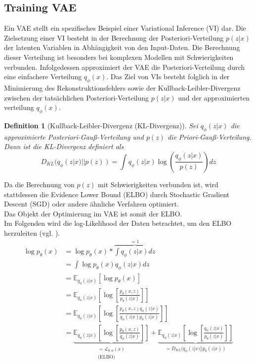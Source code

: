 \documentclass[%
thesis=student,%
coverpage=false,%
titlepage=false,%
headmarks=true, %
german,%
font=libertine, %
math=newpxtx, %
BCOR=5mm,%
coverBCOR=11mm%
]{tumbook}
\theoremstyle{break}
\newtheorem{definition}{Definition}[section]
\begin{document}
\subsection{Training VAE}
Ein VAE stellt ein spezifisches Beispiel einer Variational Inference (VI) dar. Die Zielsetzung einer VI besteht in der Berechnung der  Posteriori-Verteilung $p(z|x)$ der latenten Variablen in Abhängigkeit von den Input-Daten.  Die Berechnung dieser Verteilung ist besonders bei komplexen Modellen mit Schwierigkeiten verbunden. Infolgedessen approximiert der VAE die Posteriori-Verteilung durch eine einfachere Verteilung $q_\phi(x)$. Das Ziel von VIs besteht folglich in der Minimierung des Rekonstruktionsfehlers sowie der Kullback-Leibler-Divergenz zwischen der tatsächlichen Posteriori-Verteilung $p(z|x)$ und  der approximierten verteilung $q_\phi(x)$. 
\begin{definition}[Kullback-Leibler-Divergenz (KL-Divergenz)]
Sei $q_\phi(z|x)$ die approximierte Posteriori-Gauß-Verteilung und $p(z)$ die Priori-Gauß-Verteilung. Dann ist die KL-Divergenz definiert als
$$D_{KL}(q_\phi(z|x)||p(z))= \int q_\phi(z|x) \log \left(\frac{q_\phi(z|x)}{p(z)} \right)dz$$
\end{definition}\noindent
Da die Berechnung von  $p(z)$ mit Schwierigkeiten verbunden ist, wird  stattdessen die Evidence Lower Bound (ELBO) durch Stochastic Gradient Descent (SGD) oder andere ähnliche Verfahren optimiert.\\
Das Objekt der Optimierung im VAE ist somit der ELBO. \\
Im Folgenden wird die log-Likelihood der Daten betrachtet, um den ELBO herzuleiten (vgl. \cite{IntroductiontoVAEs}).\\
\begin{align}
 	\log p_\theta(x) &= \log p_\theta(x) * \overbrace{\int q_\phi(z|x) dz}^{=1} \\
 	&= \int \log p_\theta(x) q_\phi(z|x) dz \\
 	&= \mathbb{E}_{q_\phi(z|x)}[\log p_\theta(x)] \\
 	&= \mathbb{E}_{q_\phi(z|x)}\left[\log\left[ \frac{p_\theta(x,z)}{p_\theta(z|x)}\right]\right] \\
 	&= \mathbb{E}_{q_\phi(z|x)}\left[\log\left[ \frac{p_\theta(x,z)q_\phi(z|x)}{q_\phi(z|x)p_\theta(z|x)}\right]\right] \\
 	&= \underbrace{\mathbb{E}_{q_\phi(z|x)}\left[\log\left[ \frac{p_\theta(x,z)}{q_\phi(z|x)}\right]\right]}_{\substack{\text{$= \mathcal{L}_{\theta,\phi}(x)$}\\\text{(ELBO)}}} + \underbrace{\mathbb{E}_{q_\phi(z|x)}\left[\log\left[ \frac{q_\phi(z|x)}{p_\theta(z|x)}\right]\right]}_{=D_{KL}(q_\phi(z|x)||p_\theta(z|x))} \label{ELBO & DKL Gleichung}
\end{align}
\end{document}
